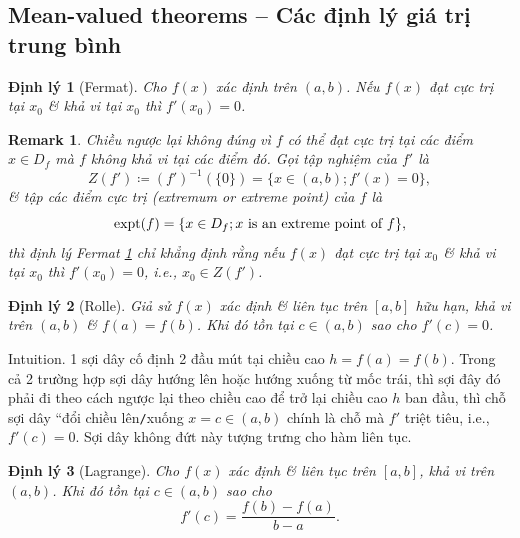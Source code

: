 \documentclass{article}
\newtheorem{dinhly}{Định lý}
\newtheorem{remark}{Remark}
\begin{document}
\subsection{Mean-valued theorems -- Các định lý giá trị trung bình}

\begin{dinhly}[Fermat]
	\label{dl: Fermat}
	Cho $f(x)$ xác định trên $(a,b)$. Nếu $f(x)$ đạt cực trị tại $x_0$ \& khả vi tại $x_0$ thì $f'(x_0) = 0$.
\end{dinhly}

\begin{remark}
	Chiều ngược lại không đúng vì $f$ có thể đạt cực trị tại các điểm $x\in D_f$ mà $f$ không khả vi tại các điểm đó. Gọi tập nghiệm của $f'$ là
	\begin{equation*}
		Z(f')\coloneqq(f')^{-1}(\{0\}) = \{x\in(a,b);f'(x) = 0\},
	\end{equation*}
	\& tập các điểm cực trị (extremum or extreme point) của $f$ là
	\begin{equation*}
		{\rm expt}(f) = \{x\in D_f;x\mbox{ is an extreme point of } f\},
	\end{equation*}
	thì định lý Fermat \ref{dl: Fermat} chỉ khẳng định rằng nếu $f(x)$ đạt cực trị tại $x_0$ \& khả vi tại $x_0$ thì $f'(x_0) = 0$, i.e., $x_0\in Z(f')$.
\end{remark}

\begin{dinhly}[Rolle]
	\label{dl: Rolle}
	Giả sử $f(x)$ xác định \& liên tục trên $[a,b]$ hữu hạn, khả vi trên $(a,b)$ \& $f(a) = f(b)$. Khi đó tồn tại $c\in(a,b)$ sao cho $f'(c) = 0$.
\end{dinhly}
{\sf Intuition.} 1 sợi dây cố định 2 đầu mút tại chiều cao $h = f(a) = f(b)$. Trong cả 2 trường hợp sợi dây hướng lên hoặc hướng xuống từ mốc trái, thì sợi đây đó phải đi theo cách ngược lại theo chiều cao để trở lại chiều cao $h$ ban đầu, thì chỗ sợi dây ``đổi chiều lên{\tt/}xuống $x = c\in(a,b)$ chính là chỗ mà $f'$ triệt tiêu, i.e., $f'(c) = 0$. Sợi dây không đứt này tượng trưng cho hàm liên tục.

\begin{dinhly}[Lagrange]
	\label{dl: Lagrange}
	Cho $f(x)$ xác định \& liên tục trên $[a,b]$, khả vi trên $(a,b)$. Khi đó tồn tại $c\in(a,b)$ sao cho
	\begin{equation}
		\label{Lagrange}
		f'(c) = \dfrac{f(b) - f(a)}{b - a}.
	\end{equation}
\end{dinhly}
\end{document}
